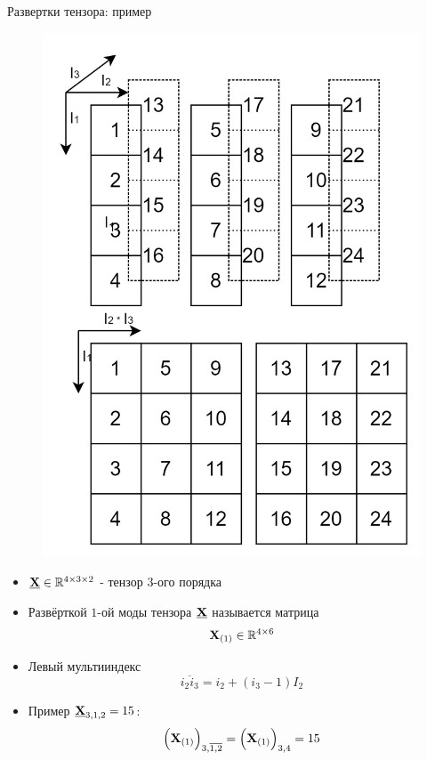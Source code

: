 \begin{frame}{Развертки тензора: пример}

\begin{minipage}{0.4\textwidth}
\begin{figure}
    \centering
    \includegraphics[width=\textwidth]{lecture_11/figs/matricization_example.png}
\end{figure}
\end{minipage}%
\hfill%
\begin{minipage}{0.6\textwidth}%
\begin{itemize}
\item $\underline{\textbf{X}} \in \mathbb{R}^{4 \times 3 \times 2}$ - тензор $3$-ого порядка
\item Развёрткой $1$-ой моды тензора $\underline{\textbf{X}}$ называется матрица $$\textbf{X}_{(1)} \in \mathbb{R}^{4 \times 6} $$
\item Левый мультииндекс
$$ \overline{i_2 i_3} = i_2 + (i_3 - 1)I_2$$
\item Пример $\underline{\textbf{X}}_{3,1,2} = 15$:
$$\Big(\textbf{X}_{(1)}\Big)_{3, \overline{1, 2}} = \Big(\textbf{X}_{(1)}\Big)_{3, 4} = 15$$
\end{itemize}
\end{minipage}


\end{frame}
